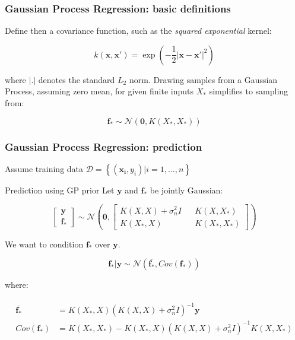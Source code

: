 \documentclass[10pt]{beamer}
\begin{document}
		\begin{frame}	
			\frametitle{Gaussian Process Regression: basic definitions}
			Define then a covariance function, such as the \textit{squared exponential} kernel:
			
			\begin{equation}
			k(\boldsymbol{x}, \boldsymbol{x}') = \exp\left(-\dfrac{1}{2}|\boldsymbol{x} - \boldsymbol{x}'|^2\right)
			\end{equation}
			
			where $|.|$ denotes the standard $L_2$ norm. Drawing samples from a Gaussian Process, assuming zero mean, for given finite inputs $X_*$ simplifies to sampling from:
			
			\begin{equation}
			\label{fprior}
			\boldsymbol{f_*} \sim \mathcal{N}\left(\boldsymbol{0}, K(X_*, X_*)\right)
			\end{equation}
			
		\end{frame}
		
		\begin{frame}
			\frametitle{Gaussian Process Regression: prediction}
			Assume training data  $\mathcal{D} = \left\lbrace \left(\boldsymbol{x_i}, y_i\right) | i = 1,\dots,n\right\rbrace$
			\begin{block}{Prediction using GP prior}
				Let $\boldsymbol{y}$ and $\boldsymbol{f_*}$ be jointly Gaussian:
				
				\begin{equation}
				\begin{bmatrix}
				\boldsymbol{y}\\
				\boldsymbol{f_*}
				\end{bmatrix} \sim \mathcal{N}\left(
				\boldsymbol{0},
				\begin{bmatrix}
				K(X, X) + \sigma^2_n I && K(X, X_*) \\
				K(X_*, X) && K(X_*, X_*)
				\end{bmatrix}
				\right)
				\end{equation}
				
				We want to condition $\boldsymbol{f_*}$ over $\boldsymbol{y}$.
				
				\begin{equation}
				\boldsymbol{f_*|y} \sim \mathcal{N}(\boldsymbol{\overline{f_*}},  Cov(\boldsymbol{f_*}))
				\end{equation}
				
				where:
				
				\begin{align}
				\begin{split}
				\boldsymbol{\overline{f_*}} &= K(X_*, X)\left(K(X, X) + \sigma^2_n I   \right)^{-1}\boldsymbol{y}\\
				Cov(\boldsymbol{f_*}) &= K(X_*, X_*) - K(X_*, X)\left(K(X, X) + \sigma_n^2 I \right)^{-1}K(X, X_*)
				\end{split}
				\end{align}
				
			
			\end{block}
		\end{frame}
		
\end{document}
